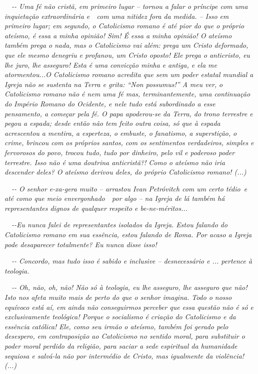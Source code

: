 \emph{~~-\/- Uma fé não cristã, em primeiro lugar -- tornou a falar o
príncipe com uma inquietação extraordinária e~~com uma nitidez fora da
medida. -- Isso em primeiro lugar; em segundo, o Catolicismo romano é
até pior do que o próprio ateísmo, é essa a minha opinião! Sim! É essa a
minha opinião! O ateísmo também prega o nada, mas o Catolicismo vai
além: prega um Cristo deformado, que ele mesmo denegriu e profanou, um
Cristo oposto! Ele prega o anticristo, eu lhe juro, lhe asseguro! Esta é
uma convicção minha e antiga, e ela me atormentou...O Catolicismo romano
acredita que sem um poder estatal mundial a Igreja não se sustenta na
Terra e grita: ``Non possumus!'' A meu ver, o Catolicismo romano não é
nem uma fé mas, terminantemente, uma continuação do Império Romano do
Ocidente, e nele tudo está subordinado a esse pensamento, a começar pela
fé. O papa apoderou-se da Terra, do trono terrestre e pegou a espada;
desde então não tem feito outra coisa, só que à espada acrescentou a
mentira, a esperteza, o embuste, o fanatismo, a superstição, o crime,
brincou com os próprios santos, com os sentimentos verdadeiros, simples
e fervorosos do povo, trocou tudo, tudo por dinheiro, pelo vil e
poderoso poder terrestre. Isso não é uma doutrina anticristã?! Como o
ateísmo não iria descender deles? O ateísmo derivou deles, do próprio
Catolicismo romano! (...)}

\emph{~~-\/- O senhor e-xa-gera muito -- arrastou Ivan Petróvitch com um
certo tédio~e até como que meio envergonhado~~por algo -- na Igreja de
lá também há representantes dignos de qualquer respeito e
be-ne-méritos...}

\emph{~~-\/-Eu nunca falei de representantes isolados da Igreja. Estou
falando do Catolicismo romano em sua essência, estou falando de Roma.
Por acaso a Igreja pode desaparecer totalmente? Eu nunca disse isso!}

\emph{~~-\/- Concordo, mas tudo isso é sabido e inclusive --
desnecessário e ... pertence à teologia.}

\emph{~~-\/- Oh, não, oh, não! Não só à teologia, eu lhe asseguro, lhe
asseguro que não! Isto nos afeta muito mais de perto do que o senhor
imagina. Todo o nosso equívoco está aí, em ainda não conseguirmos
perceber que essa questão não é só e exclusivamente teológica! Porque o
socialismo é criação do Catolicismo e da essência católica! Ele, como
seu irmão o ateísmo, também foi gerado pelo desespero, em contraposição
ao Catolicismo no sentido moral, para substituir o poder moral perdido
da religião, para saciar a sede espiritual da humanidade sequiosa e
salvá-la não por intermédio de Cristo, mas igualmente da violência!
(...)}

